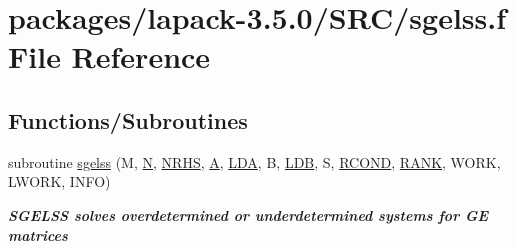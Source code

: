 \hypertarget{sgelss_8f}{}\section{packages/lapack-\/3.5.0/\+S\+R\+C/sgelss.f File Reference}
\label{sgelss_8f}
\subsection*{Functions/\+Subroutines}
\begin{DoxyCompactItemize}
\item 
subroutine \hyperlink{group__realGEsolve_ga206e3084597d088b31dc054a69aec93f}{sgelss} (M, \hyperlink{polmisc_8c_a0240ac851181b84ac374872dc5434ee4}{N}, \hyperlink{example__user_8c_aa0138da002ce2a90360df2f521eb3198}{N\+R\+H\+S}, \hyperlink{classA}{A}, \hyperlink{example__user_8c_ae946da542ce0db94dced19b2ecefd1aa}{L\+D\+A}, B, \hyperlink{example__user_8c_a50e90a7104df172b5a89a06c47fcca04}{L\+D\+B}, S, \hyperlink{superlu__enum__consts_8h_af00a42ecad444bbda75cde1b64bd7e72a9b5c151728d8512307565994c89919d5}{R\+C\+O\+N\+D}, \hyperlink{splinemodule_8c_a3a88bcc63386de30443dacede2e01847}{R\+A\+N\+K}, W\+O\+R\+K, L\+W\+O\+R\+K, I\+N\+F\+O)
\begin{DoxyCompactList}\small\item\em {\bfseries  S\+G\+E\+L\+S\+S solves overdetermined or underdetermined systems for G\+E matrices} \end{DoxyCompactList}\end{DoxyCompactItemize}
